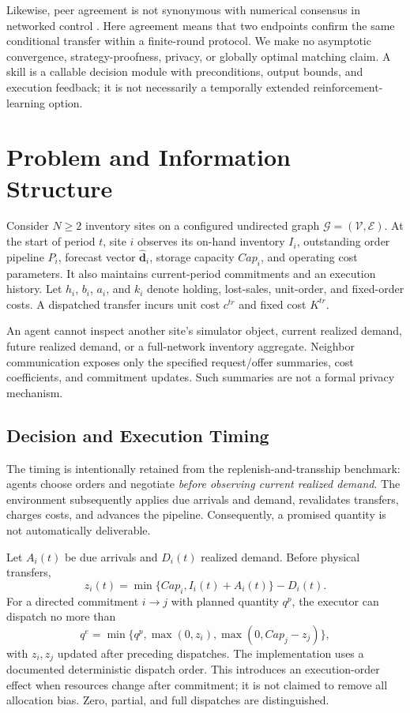 \documentclass[journal]{IEEEtran}
\begin{document}
Likewise, peer agreement is not synonymous with numerical consensus in
networked control \cite{olfati2007consensus}. Here agreement means that two
endpoints confirm the same conditional transfer within a finite-round
protocol. We make no asymptotic convergence, strategy-proofness, privacy, or
globally optimal matching claim. A skill is a callable decision module with
preconditions, output bounds, and execution feedback; it is not necessarily a
temporally extended reinforcement-learning option.

\section{Problem and Information Structure}
\label{sec:problem}
Consider $N\geq 2$ inventory sites on a configured undirected graph
$\mathcal G=(\mathcal V,\mathcal E)$. At the start of period $t$, site $i$
observes its on-hand inventory $I_i$, outstanding order pipeline $P_i$,
forecast vector $\hat{\mathbf d}_i$, storage capacity $Cap_i$, and operating
cost parameters. It also maintains current-period commitments and an
execution history. Let $h_i$, $b_i$, $a_i$, and $k_i$ denote holding,
lost-sales, unit-order, and fixed-order costs. A dispatched transfer incurs
unit cost $c^{tr}$ and fixed cost $K^{tr}$.

An agent cannot inspect another site's simulator object, current realized
demand, future realized demand, or a full-network inventory aggregate.
Neighbor communication exposes only the specified request/offer summaries,
cost coefficients, and commitment updates. Such summaries are not a formal
privacy mechanism.

\subsection{Decision and Execution Timing}
The timing is intentionally retained from the replenish-and-transship
benchmark: agents choose orders and negotiate \emph{before observing current
realized demand}. The environment subsequently applies due arrivals and
demand, revalidates transfers, charges costs, and advances the pipeline.
Consequently, a promised quantity is not automatically deliverable.

Let $A_i(t)$ be due arrivals and $D_i(t)$ realized demand. Before physical
transfers,
\begin{equation}
    z_i(t)=\min\{Cap_i,I_i(t)+A_i(t)\}-D_i(t).
\end{equation}
For a directed commitment $i\rightarrow j$ with planned quantity $q^p$,
the executor can dispatch no more than
\begin{equation}
    q^e=\min\{q^p,\max(0,z_i),\max(0,Cap_j-z_j)\},
    \label{eq:execution}
\end{equation}
with $z_i,z_j$ updated after preceding dispatches. The implementation uses a
documented deterministic dispatch order. This introduces an execution-order
effect when resources change after commitment; it is not claimed to remove
all allocation bias. Zero, partial, and full dispatches are distinguished.
\end{document}
